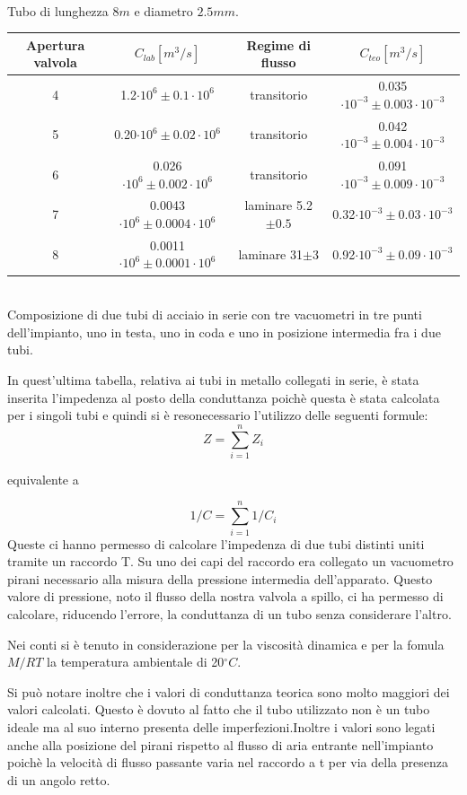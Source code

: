 \documentclass[a4paper,11pt]{article}
\begin{document}
\begin{center}
\begin{tabular}{|c|c|c|c|}
\hline 
\end{tabular}\\
\vspace{3pt}
Tubo di lunghezza $8m$ e diametro $2.5mm$.
\\
\vspace{10pt}
\begin{tabular}{|c|c|c|c|}
\hline Apertura valvola & $C_{lab} [m^3/s]$ & Regime di flusso & $C_{teo} [m^3/s]$ \\ 
\hline 4 & 1.2$\cdot10^{6}\pm 0.1\cdot10^{6} $ & transitorio & 0.035 $\cdot10^{-3}\pm 0.003\cdot10^{-3}$ \\ 
\hline 5 & 0.20$\cdot10^{6}\pm 0.02\cdot10^{6}$ & transitorio & 0.042 $\cdot10^{-3}\pm 0.004\cdot10^{-3}$\\ 
\hline 6 & 0.026$\cdot10^{6}\pm 0.002\cdot10^{6}$ & transitorio & 0.091$\cdot10^{-3}\pm 0.009\cdot10^{-3}$ \\
\hline 7 & 0.0043$\cdot10^{6}\pm 0.0004\cdot10^{6}$ & laminare 5.2$\pm0.5$ & 0.32$\cdot10^{-3}\pm 0.03\cdot10^{-3}$ \\
\hline 8 & 0.0011$\cdot10^{6}\pm 0.0001\cdot10^{6}$ & laminare 31$\pm3$ & 0.92$\cdot10^{-3}\pm 0.09\cdot10^{-3}$ \\ 
\hline 
\end{tabular}\\
\vspace{3pt}
Composizione di due tubi di acciaio in serie con tre vacuometri in tre punti dell'impianto, uno in testa, uno in coda e uno in posizione intermedia fra i due tubi.

\end{center}
In quest'ultima tabella, relativa ai tubi in metallo collegati in serie, è stata inserita l'impedenza al posto della conduttanza poichè questa è stata calcolata per i singoli tubi e quindi si è resonecessario l'utilizzo delle seguenti formule: $$Z=\sum_{i=1}^{n}Z_i $$ \begin{center}equivalente a\end{center}  $$ 1/C=\sum_{i=1}^{n}1/C_i $$
Queste ci hanno permesso di calcolare l'impedenza di due tubi distinti uniti tramite un raccordo T. Su uno dei capi del raccordo era collegato un vacuometro pirani necessario alla misura della pressione intermedia dell'apparato. Questo valore di pressione, noto il flusso della nostra valvola a spillo, ci ha permesso di calcolare, riducendo l'errore, la conduttanza di un tubo senza considerare l'altro.

Nei conti si è tenuto in considerazione per la viscosità dinamica e per la fomula $ M/RT $ la temperatura ambientale di 20$^\circ C$.

Si può notare inoltre che i valori di conduttanza teorica sono molto maggiori dei valori calcolati. Questo è dovuto al fatto che il tubo utilizzato non è un tubo ideale ma al suo interno presenta delle imperfezioni.Inoltre i valori sono legati anche alla posizione del pirani rispetto al flusso di aria entrante nell'impianto poichè la velocità di flusso passante varia nel raccordo a t per via della presenza di un angolo retto.
\end{document}
